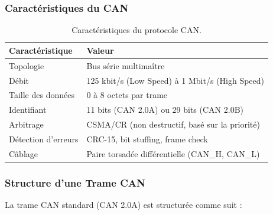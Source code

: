 \subsubsection{Caractéristiques du CAN}

\begin{table}[H]
\centering
\caption{Caractéristiques du protocole CAN.}
\label{tab:can_specs}
\renewcommand{\arraystretch}{1.3}
\begin{tabular}{|l|l|}
\hline
\rowcolor{stellantisblue!15}
\textbf{Caractéristique} & \textbf{Valeur} \\
\hline
Topologie & Bus série multimaître \\
\hline
Débit & 125 kbit/s (Low Speed) à 1 Mbit/s (High Speed) \\
\hline
Taille des données & 0 à 8 octets par trame \\
\hline
Identifiant & 11 bits (CAN 2.0A) ou 29 bits (CAN 2.0B) \\
\hline
Arbitrage & CSMA/CR (non destructif, basé sur la priorité) \\
\hline
Détection d'erreurs & CRC-15, bit stuffing, frame check \\
\hline
Câblage & Paire torsadée différentielle (CAN\_H, CAN\_L) \\
\hline
\end{tabular}
\end{table}

\subsubsection{Structure d'une Trame CAN}

La trame CAN standard (CAN 2.0A) est structurée comme suit :

